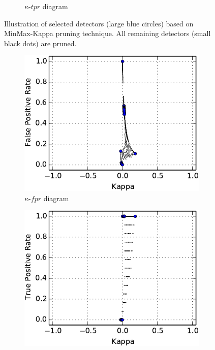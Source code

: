 \begin{figure}[tbh]
\begin{adjustbox}{minipage=\linewidth,scale=0.8}
\begin{subfigure}[b]{\columnwidth}
        \caption{$\kappa$-$tpr$ diagram}
        \label{fig:MinMax-Kappa-tpr}
    \end{subfigure}
    \caption{Illustration of selected detectors (large blue circles) based on MinMax-Kappa pruning technique. All remaining detectors (small black dots) are pruned.}
    \label{fig:MinMax-Kappa-fpr-tpr}
    \end{adjustbox}
\end{figure}

\begin{figure}[tbh]
    \centering
    \begin{adjustbox}{minipage=\linewidth,scale=0.8}
    \begin{subfigure}[b]{\columnwidth}
        \centering
        \includegraphics[width=\linewidth]{figs/ROCCH-GT-Kappa-fpr-selected-crop}
        \caption{$\kappa$-$fpr$ diagram}
        \label{fig:ROCCH-Kappa-fpr}
    \vspace{0.7cm}
    \end{subfigure}
    \begin{subfigure}[b]{\columnwidth}
        \centering
        \includegraphics[width=\linewidth]{figs/ROCCH-GT-Kappa-tpr-selected-crop}

\end{subfigure}
\end{adjustbox}
\end{figure}
